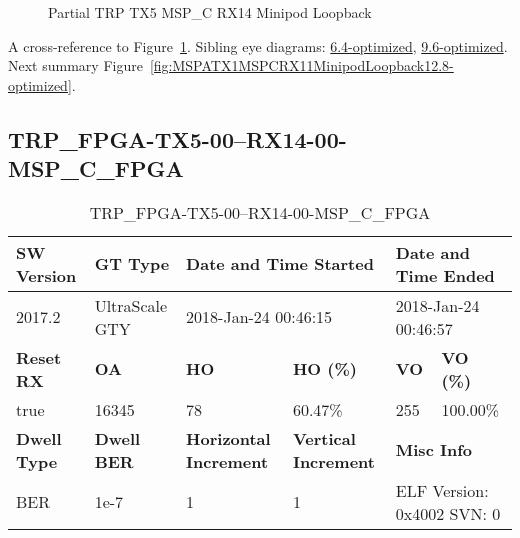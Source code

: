 \begin{figure}[h]
\begin{subfigure}{0.5\textwidth}
\hyperref[sec:TRPFPGATX506RX1406MSPCFPGA12.8-optimized]{}
\end{subfigure}\hspace*{\fill}
\begin{subfigure}{0.5\textwidth}
\hyperref[sec:TRPFPGATX507RX1407MSPCFPGA12.8-optimized]{}
\end{subfigure}

\caption{Partial TRP TX5 MSP\_C RX14 Minipod Loopback} \label{fig:PartialTRPTX5MSPCRX14MinipodLoopback12.8-optimized}
\end{figure}

A cross-reference to Figure~\ref{fig:PartialTRPTX5MSPCRX14MinipodLoopback12.8-optimized}.
Sibling eye diagrams: \hyperref[sec:PartialTRPTX5MSPCRX14MinipodLoopback6.4-optimized]{6.4-optimized}, \hyperref[sec:PartialTRPTX5MSPCRX14MinipodLoopback9.6-optimized]{9.6-optimized}. \\
Next summary Figure~\ref{fig:MSPATX1MSPCRX11MinipodLoopback12.8-optimized}.
\clearpage
% 
\subsection{TRP\_FPGA-TX5-00--RX14-00-MSP\_C\_FPGA}\label{sec:TRPFPGATX500RX1400MSPCFPGA12.8-optimized}

\begin{table}[h]
\centering
\caption{TRP\_FPGA-TX5-00--RX14-00-MSP\_C\_FPGA}
\label{tab:TRPFPGATX500RX1400MSPCFPGA12.8-optimized}
\begin{tabular}{@{}|l|l|l|l|l|l|@{}}
\toprule
\textbf{SW Version}                & \textbf{GT Type}   & \multicolumn{2}{l|}{\textbf{Date and Time Started}}            & \multicolumn{2}{l|}{\textbf{Date and Time Ended}}        \\ \midrule
2017.2                       & UltraScale GTY          & \multicolumn{2}{l|}{2018-Jan-24 00:46:15}                   & \multicolumn{2}{l|}{2018-Jan-24 00:46:57}               \\ \midrule
\textbf{Reset RX}                  & \textbf{OA} & \textbf{HO}   & \textbf{HO (\%)} & \textbf{VO} & \textbf{VO (\%)} \\ \midrule
true & 16345        & 78          & 60.47\%        & 255        & 100.00\%       \\ \midrule
\textbf{Dwell Type}                & \textbf{Dwell BER} & \textbf{Horizontal Increment} & \textbf{Vertical Increment}    & \multicolumn{2}{l|}{\textbf{Misc Info}}                  \\ \midrule
BER                            & 1e-7        & 1        & 1           & \multicolumn{2}{l|}{ELF Version: 0x4002 SVN: 0}                         \\ \bottomrule
\end{tabular}
\end{table}

